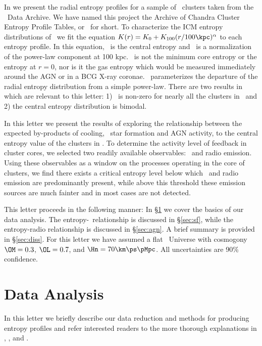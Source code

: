 \documentclass{emulateapj}
\begin{document}
In \cite{accept} we present the radial entropy profiles for a sample
of \clnum\ clusters taken from the \Chandra\ Data Archive. We have
named this project the Archive of Chandra Cluster Entropy Profile
Tables, or \accept\ for short. To characterize the ICM entropy
distributions of \accept\ we fit the equation $K(r) = K_0
+K_{100}(r/100 \kpc)^{\alpha}$ to each entropy profile. In this
equation, \kna\ is the central entropy and \khun\ is a normalization
of the power-law component at 100 kpc. \kna\ is not the minimum core
entropy or the entropy at $r=0$, nor is it the gas entropy which would
be measured immediately around the AGN or in a BCG X-ray
coronae. \kna\ parameterizes the departure of the radial entropy
distribution from a simple power-law. There are two results in
\cite{accept} which are relevant to this letter: 1) \kna\ is non-zero
for nearly all the clusters in \accept\, and 2) the central entropy
distribution is bimodal.

In this letter we present the results of exploring the relationship
between the expected by-products of cooling, \eg\ star formation and
AGN activity, to the central entropy value of the clusters in
\accept. To determine the activity level of feedback in cluster cores,
we selected two readily available observables: \halpha\ and radio
emission. Using these observables as a window on the processes
operating in the core of clusters, we find there exists a critical
entropy level below which \halpha\ and radio emission are
predominantly present, while above this threshold these emission
sources are much fainter and in most cases are not detected.

This letter proceeds in the following manner: In \S\ref{sec:data} we
cover the basics of our data analysis. The
entropy-\halpha\ relationship is discussed in \S\ref{sec:sf}, while
the entropy-radio relationship is discussed in \S\ref{sec:agn}. A
brief summary is provided in \S\ref{sec:diss}.  For this letter we
have assumed a flat \LCDM\ Universe with cosmogony $\OM=0.3$,
$\OL=0.7$, and $\Hn=70\km\ps\pMpc$. All uncertainties are 90\%
confidence.

\section{Data Analysis}
\label{sec:data}

In this letter we briefly describe our data reduction and methods for
producing entropy profiles and refer interested readers to the more
thorough explanations in \cite{d06}, \cite{accept}, and
\cite{xrayband}.
\end{document}

